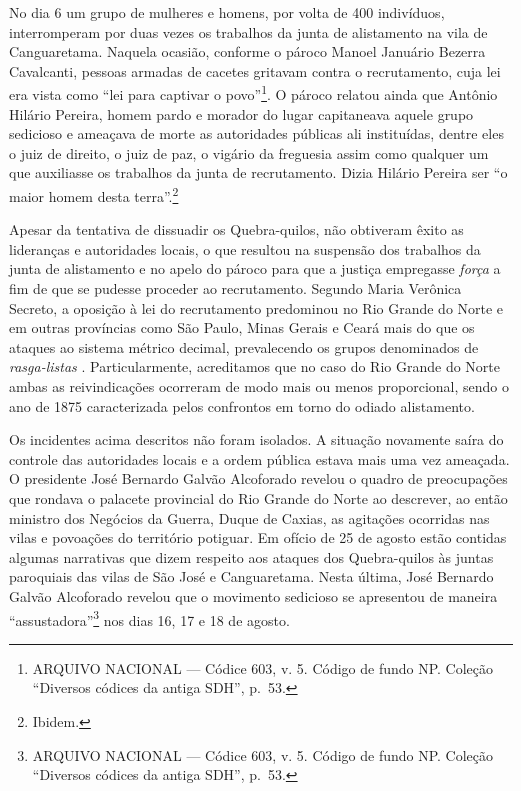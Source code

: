 \begin{refsection}
No dia 6 um grupo de mulheres e homens, por volta de 400 indivíduos, interromperam por duas vezes os trabalhos da junta de alistamento na vila de Canguaretama. Naquela ocasião, conforme o pároco Manoel Januário Bezerra Cavalcanti, pessoas armadas de cacetes gritavam contra o recrutamento, cuja lei era vista como “lei para captivar o povo”\footnote{ARQUIVO NACIONAL --- Códice 603, v. 5. Código de fundo NP. Coleção “Diversos códices da antiga SDH”, p.~53.}. O pároco relatou ainda que Antônio Hilário Pereira, homem pardo e morador do lugar capitaneava aquele grupo sedicioso e ameaçava de morte as autoridades públicas ali instituídas, dentre eles o juiz de direito, o juiz de paz, o vigário da freguesia assim como qualquer um que auxiliasse os trabalhos da junta de recrutamento. Dizia Hilário Pereira ser “o maior homem desta terra”.\footnote{Ibidem.}

Apesar da tentativa de dissuadir os Quebra-quilos, não obtiveram êxito as lideranças e autoridades locais, o que resultou na suspensão dos trabalhos da junta de alistamento e no apelo do pároco para que a justiça empregasse \textit{força} a fim de que se pudesse proceder ao recrutamento. Segundo Maria Verônica Secreto, a oposição à lei do recrutamento predominou no Rio Grande do Norte e em outras províncias como São Paulo, Minas Gerais e Ceará mais do que os ataques ao sistema métrico decimal, prevalecendo os grupos denominados de \textit{rasga-listas} \cite[p.~81]{secreto2011medidos}. Particularmente, acreditamos que no caso do Rio Grande do Norte ambas as reivindicações ocorreram de modo mais ou menos proporcional, sendo o ano de 1875 caracterizada pelos confrontos em torno do odiado alistamento. 

Os incidentes acima descritos não foram isolados. A situação novamente saíra do controle das autoridades locais e a ordem pública estava mais uma vez ameaçada. O presidente José Bernardo Galvão Alcoforado revelou o quadro de preocupações que rondava o palacete provincial do Rio Grande do Norte ao descrever, ao então ministro dos Negócios da Guerra, Duque de Caxias, as agitações ocorridas nas vilas e povoações do território potiguar. Em ofício de 25 de agosto estão contidas algumas narrativas que dizem respeito aos ataques dos Quebra-quilos às juntas paroquiais das vilas de São José e Canguaretama. Nesta última, José Bernardo Galvão Alcoforado revelou que o movimento sedicioso se apresentou de maneira “assustadora”\footnote{ARQUIVO NACIONAL --- Códice 603, v. 5. Código de fundo NP. Coleção “Diversos códices da antiga SDH”, p.~53.} nos dias 16, 17 e 18 de agosto.


\end{refsection}
